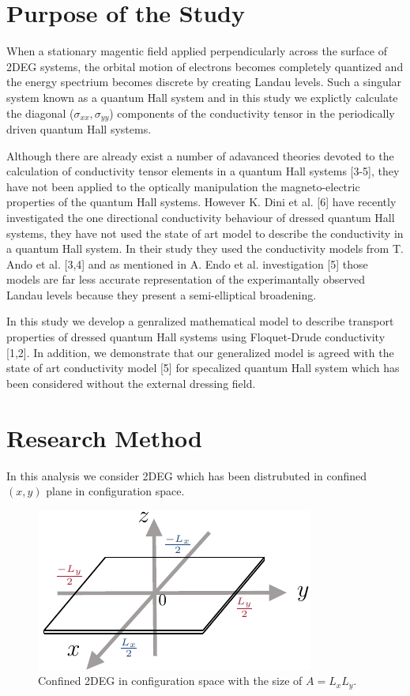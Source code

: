 \documentclass[a4paper]{article}
\numberwithin{equation}{subsection}
\numberwithin{equation}{section}
\begin{document}
\section*{Purpose of the Study}

When a stationary magentic field applied perpendicularly across the surface of 2DEG systems, the orbital motion of electrons becomes completely quantized and the energy spectrium becomes discrete by creating Landau levels. Such a singular system known as a quantum Hall system and in this study we explictly calculate the diagonal ($\sigma_{xx},\sigma_{yy}$) components of the conductivity tensor in the periodically driven quantum Hall systems.

Although there are already exist a number of adavanced theories devoted to the calculation of conductivity tensor elements in a quantum Hall systems [3-5], they have not been applied to the optically manipulation the magneto-electric properties of the quantum Hall systems. However K. Dini et al. [6] have recently investigated the one directional conductivity behaviour of dressed quantum Hall systems, they have not used the state of art model to describe the conductivity in a quantum Hall system. In their study they used the conductivity models from T. Ando et al. [3,4] and as mentioned in A. Endo et al. investigation [5] those models are far less accurate representation of the experimantally observed Landau levels because they present a semi-elliptical broadening.

In this study we develop a genralized mathematical model to describe transport properties of dressed quantum Hall systems using Floquet-Drude conductivity [1,2]. In addition, we demonstrate that our generalized model is agreed with the state of art conductivity model [5] for specalized quantum Hall system which has been considered without the external dressing field.

\section*{Research Method}

In this analysis we consider 2DEG which has been distrubuted in confined $(x,y)$ plane in configuration space.
\begin{figure}[ht!]
  \centering
  \includegraphics[scale=0.9]{figures/fig0.pdf}
  \caption{Confined 2DEG in configuration space with the size of $A=L_xL_y$.}
  \label{fig:1}
\end{figure}
\end{document}
